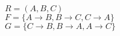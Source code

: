 \documentclass[preview]{standalone}
\begin{document}
$R = (A,B,C)$\\

$F = \big\{A\rightarrow B, B\rightarrow C, C\rightarrow A\big\}$\\
$G = \big\{C\rightarrow B, B\rightarrow A, A\rightarrow C\big\}$
\end{document}
